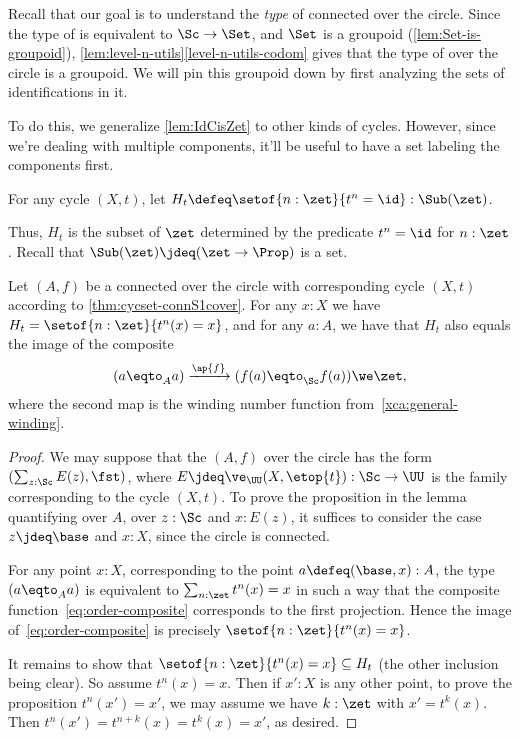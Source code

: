 Recall that our goal is to understand the \emph{type} of connected
\coverings over the circle. Since the type of \coverings is
equivalent to $\Sc\to \Set$, and $\Set$ is a groupoid
(\cref{lem:Set-is-groupoid}),
\cref{lem:level-n-utils}\ref{level-n-utils-codom} gives
that the type of \coverings over the circle is a groupoid.
We will pin this groupoid down by first analyzing the sets of
identifications in it.

To do this, we generalize \cref{lem:IdCisZet} to other kinds of cycles.
However, since we're dealing with multiple components,
it'll be useful to have a set labeling the components first.
\begin{definition}\label{def:subgroup-zet-of-cycle}									
  For any cycle $(X,t)$,
  let $H_t \defeq \setof{n:\zet}{t^n=\id} : \Sub(\zet)$.
\end{definition}
Thus, $H_t$ is the subset of $\zet$ determined by the predicate $t^n=\id$
for $n:\zet$. Recall that $\Sub(\zet)\jdeq(\zet\to\Prop)$ is a set.
\begin{lemma}\label{lem:cycle-order-point-ap}
  Let $(A,f)$ be a connected \covering over the circle
  with corresponding cycle $(X,t)$ according to \cref{thm:cycset-connS1cover}.
  For any $x:X$ we have $H_t = \setof{n:\zet}{t^n(x)=x}$,
  and for any $a:A$, we have that $H_t$
  also equals the image of the composite
  \begin{equation}\label{eq:order-composite}
    (a \eqto_A a) \xrightarrow{\ap{f}}{} (f(a) \eqto_\Sc f(a)) \we \zet,
  \end{equation}
  where the second map is the winding number function
  from~\cref{xca:general-winding}.
\end{lemma}
\begin{proof}
  We may suppose that the \covering $(A,f)$ over the circle
  has the form $(\sum_{z:\Sc} E(z),\fst)$, where
  $E\jdeq\ve_\UU(X,\etop{t}) : \Sc\to\UU$ is the family corresponding
  to the cycle $(X,t)$.
  To prove the proposition in the lemma quantifying over $A$, \ie
  over $z:\Sc$ and $x:E(z)$, it suffices to consider the case
  $z\jdeq\base$ and $x:X$, since the circle is connected.

  For any point $x:X$, corresponding to the point $a\defeq(\base,x):A$,
  the type $(a \eqto_A a)$ is equivalent to $\sum_{n:\zet}t^n(x)=x$
  in such a way that the composite function~\eqref{eq:order-composite}
  corresponds to the first projection.
  Hence the image of~\eqref{eq:order-composite} is precisely
  $\setof{n:\zet}{t^n(x)=x}$.

  It remains to show that $\setof{n:\zet}{t^n(x)=x} \subseteq H_t$
  (the other inclusion being clear).
  So assume $t^n(x)=x$.
  Then if $x':X$ is any other point, to prove the proposition
  $t^n(x')=x'$, we may assume we have $k:\zet$ with $x'=t^k(x)$. Then
  $t^n(x')=t^{n+k}(x)=t^k(x)=x'$, as desired.
\end{proof}



